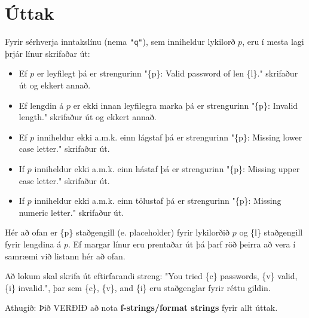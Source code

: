 \section*{Úttak}
Fyrir sérhverja inntakslínu (nema \texttt{"q"}), sem inniheldur lykilorð $p$, eru í mesta lagi þrjár línur skrifaðar út:
\begin{itemize}
    \item Ef $p$ er leyfilegt þá er strengurinn "\{p\}: Valid password of len \{l\}." skrifaður út og ekkert annað. 
    \item Ef lengdin á $p$ er ekki innan leyfilegra marka þá er strengurinn "\{p\}: Invalid length." skrifaður út og ekkert annað.
    \item Ef $p$ inniheldur ekki a.m.k. einn lágstaf þá er strengurinn "\{p\}: Missing lower case letter." skrifaður út.
    \item If $p$ inniheldur ekki a.m.k. einn hástaf þá er strengurinn "\{p\}: Missing upper case letter." skrifaður út.
    \item If $p$ inniheldur ekki a.m.k. einn tölustaf þá er strengurinn "\{p\}: Missing numeric letter." skrifaður út.
\end{itemize}
Hér að ofan er \{p\} staðgengill (e. placeholder) fyrir lykilorðið $p$ og \{l\} staðgengill fyrir lengdina á $p$.
Ef margar línur eru prentaðar út þá þarf röð þeirra að vera í samræmi við listann hér að ofan.

Að lokum skal skrifa út eftirfarandi streng:
"You tried \{c\} passwords, \{v\} valid, \{i\} invalid.", þar sem \{c\}, \{v\}, and \{i\} eru staðgenglar fyrir réttu gildin.  

Athugið: Þið VERÐIÐ að nota \textbf{f-strings/format strings} fyrir allt úttak. 

